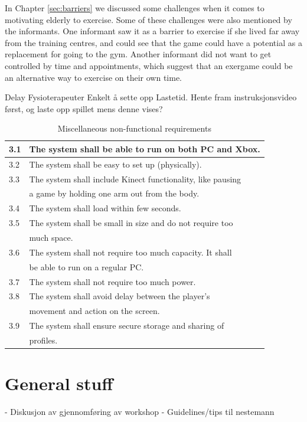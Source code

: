 In Chapter \ref{sec:barriers} we discussed some challenges when it comes to motivating elderly to exercise. Some of these challenges were also mentioned by the informants. One informant saw it as a barrier to exercise if she lived far away from the training centres, and could see that the game could have a potential as a replacement for going to the gym. Another informant did not want to get controlled by time and appointments, which suggest that an exergame could be an alternative way to exercise on their own time. 

Delay
Fysioterapeuter
Enkelt å sette opp
Lastetid. Hente fram instruksjonsvideo først, og laste opp spillet mens denne vises?

\begin{table} [H]
\label{tab:nfunc2}
\centering
\begin{tabular}{|l|l|}
\hline
3.1 & The system shall be able to run on both PC and Xbox. \\ \hline
3.2 & The system shall be easy to set up (physically).\\ \hline
3.3 & The system shall include Kinect functionality, like pausing \\ & a game by holding one arm out from the body. \\ \hline
3.4 & The system shall load within few seconds.\\ \hline
3.5 & The system shall be small in size and do not require too \\&  much space.\\ \hline
3.6 & The system shall not require too much capacity. It shall \\ & be able to run on a regular PC. \\ \hline
3.7 & The system shall not require too much power. \\ \hline
3.8 & The system shall avoid delay between the player's \\ & movement and action on the screen.\\ \hline
3.9 & The system shall ensure secure storage and sharing of \\ & profiles. \\ \hline
\end{tabular}
\caption[Miscellaneous non-functional requirements]{Miscellaneous non-functional requirements}
\end{table} 

\section{General stuff}
- Diskusjon av gjennomføring av workshop
- Guidelines/tips til nestemann
